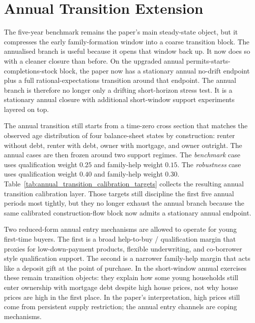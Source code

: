 
\section{Annual Transition Extension}
\label{sec:annual_transition}

The five-year benchmark remains the paper's main steady-state object, but it compresses the
early family-formation window into a coarse transition block. The annualised branch is useful
because it opens that window back up. It now does so with a cleaner closure than before. On
the upgraded annual permits-starts-completions-stock block, the paper now has a stationary
annual no-drift endpoint plus a full rational-expectations transition around that endpoint.
The annual branch is therefore no longer only a drifting short-horizon stress test. It is a
stationary annual closure with additional short-window support experiments layered on top.

The annual transition still starts from a time-zero cross section that matches the observed
age distribution of four balance-sheet states by construction: renter without debt, renter
with debt, owner with mortgage, and owner outright. The annual cases are then frozen around
two support regimes. The \emph{benchmark} case uses qualification weight $0.25$ and
family-help weight $0.15$. The \emph{robustness} case uses qualification weight $0.40$ and
family-help weight $0.30$. Table~\ref{tab:annual_transition_calibration_targets} collects the
resulting annual transition calibration layer. Those targets still discipline the first five
annual periods most tightly, but they no longer exhaust the annual branch because the same
calibrated construction-flow block now admits a stationary annual endpoint.

Two reduced-form annual entry mechanisms are allowed to operate for young first-time buyers.
The first is a broad help-to-buy / qualification margin that proxies for low-down-payment
products, flexible underwriting, and co-borrower style qualification support. The second is a
narrower family-help margin that acts like a deposit gift at the point of purchase. In the
short-window annual exercises these remain transition objects: they explain how some young
households still enter ownership with mortgage debt despite high house prices, not why house
prices are high in the first place. In the paper's interpretation, high prices still come from
persistent supply restriction; the annual entry channels are coping mechanisms.


